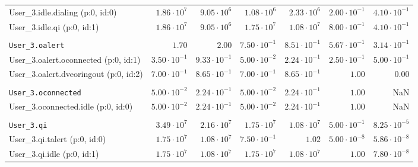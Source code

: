 \begin{table}[htbp]
{\begin{tabular}{lrrrrrr}
\hspace{3mm}User\_3.idle.dialing (p:0, id:0)          &  $1.86 \cdot 10^{7}$ &  $9.05 \cdot 10^{6}$ &  $1.08 \cdot 10^{6}$ &  $2.33 \cdot 10^{6}$ & $2.00 \cdot 10^{-1}$ & $4.10 \cdot 10^{-1}$ \\
\hspace{3mm}User\_3.idle.qi (p:0, id:1)               &  $1.86 \cdot 10^{7}$ &  $9.05 \cdot 10^{6}$ &  $1.75 \cdot 10^{7}$ &  $1.08 \cdot 10^{7}$ & $8.00 \cdot 10^{-1}$ & $4.10 \cdot 10^{-1}$ \\
\\[-8pt]\texttt{User\_3.oalert}                       &               $1.70$ &               $2.00$ & $7.50 \cdot 10^{-1}$ & $8.51 \cdot 10^{-1}$ & $5.67 \cdot 10^{-1}$ & $3.14 \cdot 10^{-1}$ \\
\hspace{3mm}User\_3.oalert.oconnected (p:0, id:1)     & $3.50 \cdot 10^{-1}$ & $9.33 \cdot 10^{-1}$ & $5.00 \cdot 10^{-2}$ & $2.24 \cdot 10^{-1}$ & $2.50 \cdot 10^{-1}$ & $5.00 \cdot 10^{-1}$ \\
\hspace{3mm}User\_3.oalert.dveoringout (p:0, id:2)    & $7.00 \cdot 10^{-1}$ & $8.65 \cdot 10^{-1}$ & $7.00 \cdot 10^{-1}$ & $8.65 \cdot 10^{-1}$ &               $1.00$ &               $0.00$ \\
\\[-8pt]\texttt{User\_3.oconnected}                   & $5.00 \cdot 10^{-2}$ & $2.24 \cdot 10^{-1}$ & $5.00 \cdot 10^{-2}$ & $2.24 \cdot 10^{-1}$ &               $1.00$ &                  NaN \\
\hspace{3mm}User\_3.oconnected.idle (p:0, id:0)       & $5.00 \cdot 10^{-2}$ & $2.24 \cdot 10^{-1}$ & $5.00 \cdot 10^{-2}$ & $2.24 \cdot 10^{-1}$ &               $1.00$ &                  NaN \\
\\[-8pt]\texttt{User\_3.qi}                           &  $3.49 \cdot 10^{7}$ &  $2.16 \cdot 10^{7}$ &  $1.75 \cdot 10^{7}$ &  $1.08 \cdot 10^{7}$ & $5.00 \cdot 10^{-1}$ & $8.25 \cdot 10^{-5}$ \\
\hspace{3mm}User\_3.qi.talert (p:0, id:0)             &  $1.75 \cdot 10^{7}$ &  $1.08 \cdot 10^{7}$ & $7.50 \cdot 10^{-1}$ &               $1.02$ & $5.00 \cdot 10^{-8}$ & $5.86 \cdot 10^{-8}$ \\
\hspace{3mm}User\_3.qi.idle (p:0, id:1)               &  $1.75 \cdot 10^{7}$ &  $1.08 \cdot 10^{7}$ &  $1.75 \cdot 10^{7}$ &  $1.08 \cdot 10^{7}$ &               $1.00$ & $7.80 \cdot 10^{-8}$ \\

\end{tabular}}
\end{table}
